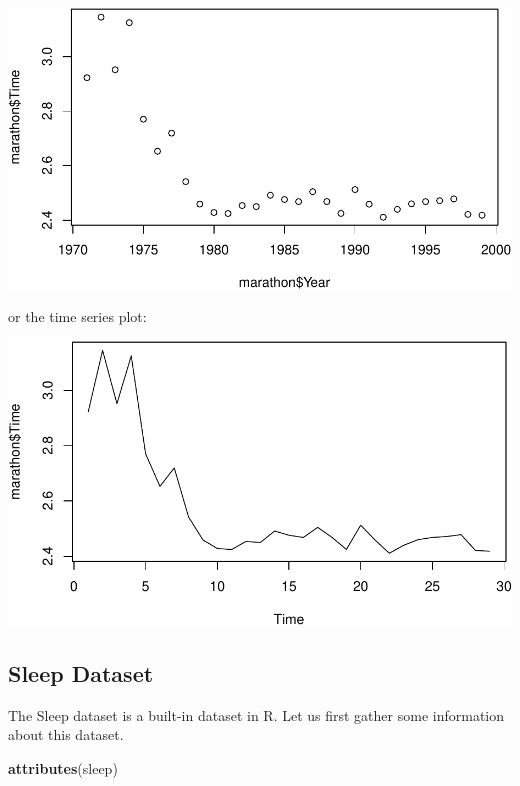 \documentclass[]{article}
\newenvironment{Shaded}{\begin{snugshade}}{\end{snugshade}}
\newcommand{\KeywordTok}[1]{\textcolor[rgb]{0.13,0.29,0.53}{\textbf{#1}}}
\newcommand{\NormalTok}[1]{#1}
\newcommand{\OperatorTok}[1]{\textcolor[rgb]{0.81,0.36,0.00}{\textbf{#1}}}
\begin{document}
\includegraphics{RMarkdown-Example_files/figure-latex/unnamed-chunk-5-1.pdf}

or the time series plot:

\begin{Shaded}
\end{Shaded}

\includegraphics{RMarkdown-Example_files/figure-latex/unnamed-chunk-6-1.pdf}

\hypertarget{sleep-dataset}{%
\subsection{Sleep Dataset}\label{sleep-dataset}}

The Sleep dataset is a built-in dataset in R. Let us first gather some
information about this dataset.

\begin{Shaded}
\begin{Highlighting}[]
\KeywordTok{attributes}\NormalTok{(sleep)}
\end{Highlighting}
\end{Shaded}
\end{document}
